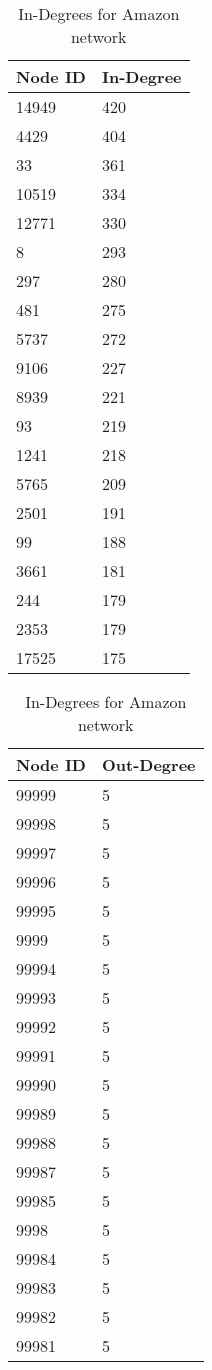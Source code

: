 \begin{table}%
\centering
\begin{tabular}{|l|l|}
\hline
Node ID & In-Degree \\
\hline
14949 & 420 \\
4429 & 404 \\
33 & 361 \\
10519 & 334 \\
12771 & 330 \\
8 & 293 \\
297 & 280 \\
481 & 275 \\
5737 & 272 \\
9106 & 227 \\
8939 & 221 \\
93 & 219 \\
1241 & 218 \\
5765 & 209 \\
2501 & 191 \\
99 & 188 \\
3661 & 181 \\
244 & 179 \\
2353 & 179 \\
17525 & 175 \\
\hline
\end{tabular}
\caption{In-Degrees for Amazon network}
\label{tab:amazonin}
\end{table}

\begin{table}%
\centering
\begin{tabular}{|l|l|}
\hline
Node ID & Out-Degree \\
\hline
99999 & 5 \\
99998 & 5 \\
99997 & 5 \\
99996 & 5 \\
99995 & 5 \\
9999 & 5 \\
99994 & 5 \\
99993 & 5 \\
99992 & 5 \\
99991 & 5 \\
99990 & 5 \\
99989 & 5 \\
99988 & 5 \\
99987 & 5 \\
99985 & 5 \\
9998 & 5 \\
99984 & 5 \\
99983 & 5 \\
99982 & 5 \\
99981 & 5 \\
\hline
\end{tabular}
\caption{In-Degrees for Amazon network}
\label{tab:amazonout}
\end{table}


